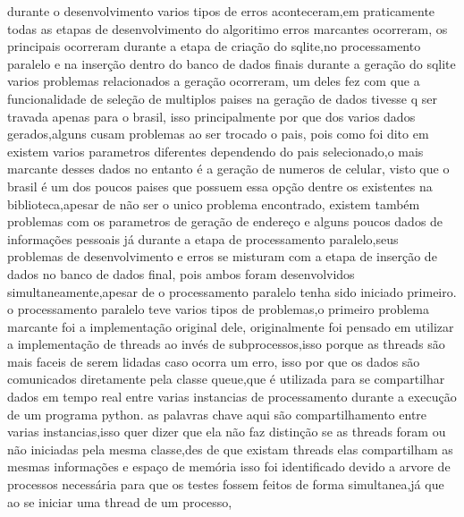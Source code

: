 \documentclass[
	12pt,				%
	openright,			%
	oneside,			%
	a4paper,			%
	english,			%
	french,				%
	spanish,			%
	brazil,				%
	]{abntex2}
\begin{document}
durante o desenvolvimento varios tipos de erros aconteceram,em praticamente todas as etapas de desenvolvimento do algoritimo erros marcantes ocorreram,
os principais ocorreram durante a etapa de criação do sqlite,no processamento paralelo e na inserção dentro do banco de dados finais\newline
durante a geração do sqlite varios problemas relacionados a geração ocorreram,
um deles fez com que a funcionalidade de seleção de multiplos paises na geração de dados tivesse q ser travada apenas para o brasil,
isso principalmente por que dos varios dados gerados,alguns cusam problemas ao ser trocado o pais,
pois como foi dito em  existem varios parametros diferentes dependendo do pais selecionado,o mais marcante desses dados no entanto é a geração de numeros de celular,
visto que o brasil é um dos poucos paises que possuem essa opção dentre os existentes na biblioteca,apesar de não ser o unico problema encontrado,
existem também problemas com os parametros de geração de endereço e alguns poucos dados de informações pessoais\newline
já durante a etapa de processamento paralelo,seus problemas de desenvolvimento e erros se misturam com a etapa de inserção de dados no banco de dados final,
pois ambos foram desenvolvidos simultaneamente,apesar de o processamento paralelo tenha sido iniciado primeiro.\newline
o processamento paralelo teve varios tipos de problemas,o primeiro problema marcante foi a implementação original dele,
originalmente foi pensado em utilizar a implementação de threads ao invés de subprocessos,isso porque as threads são mais faceis de serem lidadas caso ocorra um erro,
isso por que os dados são comunicados diretamente pela classe queue,que é utilizada para se compartilhar dados em tempo real entre varias instancias de processamento durante a execução de um programa python.
as palavras chave aqui são compartilhamento entre varias instancias,isso quer dizer que ela não faz distinção se as threads foram ou não iniciadas pela mesma classe,des de que existam threads elas compartilham as mesmas informações e espaço de memória\newline
isso foi identificado devido a arvore de processos necessária para que os testes fossem feitos de forma simultanea,já que ao se iniciar uma thread de um processo,
\end{document}
